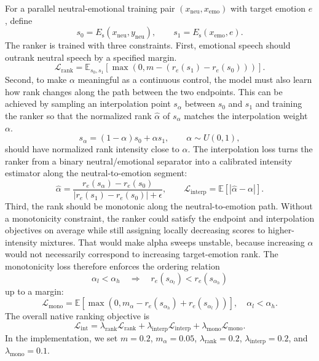 For a parallel neutral-emotional training pair $(x_{\mathrm{neu}},x_{\mathrm{emo}})$ with target emotion $e$, define
\begin{equation}
s_0=E_{\text{s}}(x_{\mathrm{neu}},y_{\mathrm{neu}}),\qquad
s_1=E_{\text{s}}(x_{\mathrm{emo}},e).
\end{equation}
The ranker is trained with three constraints.
First, emotional speech should outrank neutral speech by a specified margin.
\begin{equation}
\mathcal{L}_{\mathrm{rank}}
=
\mathbb{E}_{s_0,s_1}\left[
\max\left(0,m-\left(r_e(s_1)-r_e(s_0)\right)\right)
\right].
\end{equation}
Second, to make $\alpha$ meaningful as a continuous control, the model must also learn how rank changes along the path between the two endpoints. This can be achieved by sampling an interpolation point $s_\alpha$ between $s_0$ and $s_1$ and training the ranker so that the normalized rank $\hat{\alpha}$ of $s_\alpha$ matches the interpolation weight $\alpha$.
\begin{equation}
s_\alpha=(1-\alpha)s_0+\alpha s_1,\qquad \alpha\sim U(0,1),
\end{equation}
should have normalized rank intensity close to $\alpha$.
The interpolation loss turns the ranker from a binary neutral/emotional separator into a calibrated intensity estimator along the neutral-to-emotion segment:
\begin{equation}
\hat{\alpha}
=
\frac{r_e(s_\alpha)-r_e(s_0)}
{\left|r_e(s_1)-r_e(s_0)\right|+\epsilon},
\qquad
\mathcal{L}_{\mathrm{interp}}
=
\mathbb{E}\left[|\hat{\alpha}-\alpha|\right].
\end{equation}
Third, the rank should be monotonic along the neutral-to-emotion path.
Without a monotonicity constraint, the ranker could satisfy the endpoint and interpolation objectives on average while still assigning locally decreasing scores to higher-intensity mixtures.
That would make alpha sweeps unstable, because increasing $\alpha$ would not necessarily correspond to increasing target-emotion rank.
The monotonicity loss therefore enforces the ordering relation
\begin{equation}
\alpha_l<\alpha_h
\quad\Longrightarrow\quad
r_e(s_{\alpha_l}) < r_e(s_{\alpha_h})
\end{equation}
up to a margin:
\begin{equation}
\mathcal{L}_{\mathrm{mono}}
=
\mathbb{E}\left[
\max\left(0,m_{\alpha}-r_e(s_{\alpha_h})+r_e(s_{\alpha_l})\right)
\right],
\quad \alpha_l<\alpha_h .
\end{equation}
The overall native ranking objective is
\begin{equation}
\mathcal{L}_{\mathrm{int}}
=
\lambda_{\mathrm{rank}}\mathcal{L}_{\mathrm{rank}}
+
\lambda_{\mathrm{interp}}\mathcal{L}_{\mathrm{interp}}
+
\lambda_{\mathrm{mono}}\mathcal{L}_{\mathrm{mono}} .
\end{equation}
In the implementation, we set $m=0.2$, $m_{\alpha}=0.05$, $\lambda_{\mathrm{rank}}=0.2$, $\lambda_{\mathrm{interp}}=0.2$, and $\lambda_{\mathrm{mono}}=0.1$.

